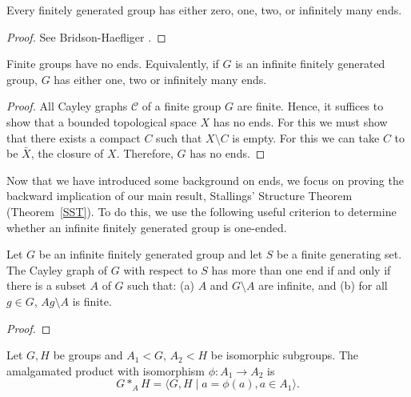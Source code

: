 \begin{theorem}
\label{FH}
    Every finitely generated group has either zero, one, two, or infinitely many ends.
\end{theorem}

\begin{proof}
    See Bridson-Haefliger \cite[p.~146--147]{bridson_haefliger_metric_1999}.
\end{proof}

\begin{corollary}
    Finite groups have no ends. Equivalently, if \(G\) is an infinite finitely generated group, \(G\) has either one, two or infinitely many ends.
\end{corollary}

\begin{proof} %
    All Cayley graphs \(\mathcal{C}\) of a finite group \(G\) are finite. Hence, it suffices to show that a bounded topological space \(X\) has no ends. For this we must show that there exists a compact \(C\) such that \(X \setminus C\) is empty. For this we can take \(C\) to be \(\bar{X}\), the closure of \(X\). Therefore, \(G\) has no ends.
\end{proof}

Now that we have introduced some background on ends, we focus on proving the backward implication of our main result, Stallings' Structure Theorem (Theorem~\ref{SST}). To do this, we use the following useful criterion to determine whether an infinite finitely generated group is one-ended.
\begin{proposition} 
Let \(G\) be an infinite finitely generated group and let \(S\) be a  finite generating set.
The Cayley graph of \(G\) with respect to \(S\) has more than one end if and only if there is a subset \(A\) of \(G\) such that:
    (a) \(A\) and \(G \setminus A\) are infinite, and
    (b) for all \(g \in G\), \(Ag \setminus A\) is finite.
\end{proposition}

\begin{proof}

\end{proof}


 \begin{definition}
     Let \(G,H\) be groups and \(A_1 < G\), \(A_2 < H\) be isomorphic subgroups. The amalgamated product with isomorphism \(\phi: A_1 \to A_2\) is 
     \[
     G *_A H = \langle G,H \mid a = \phi(a), a \in A_1 \rangle .
     \]
 \end{definition}


